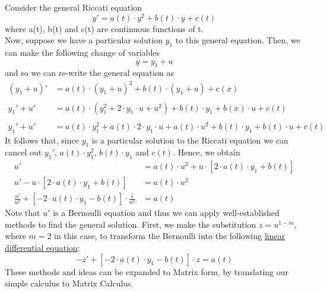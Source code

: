 Consider the general Riccati equation
\begin{equation}
    y' = a(t)\cdot y^2 + b(t)\cdot y + c(t)
\end{equation}
where a(t), b(t) and c(t) are continuous functions of t.
\\
Now, suppose we have a particular solution $y_1$ to this general equation. Then, we can make the following change of variables
\begin{equation}
    y = y_1 + u
\end{equation}
and so we can re-write the general equation as
\begin{equation}
    \begin{split}
        (y_1 + u)' & = a(t)\cdot (y_1 + u)^2 + b(t)\cdot (y_1 + u) + c(x)\\\\
        y_1' + u' & = a(t)\cdot (y_1^2 + 2\cdot y_1 \cdot u + u^2) + b(t)\cdot y_1 + b(x)\cdot u + c(t)\\\\
        y_1' + u' & = a(t)\cdot y_1^2 + a(t) \cdot 2\cdot y_1 \cdot u + a(t)\cdot u^2 + b(t)\cdot y_1 + b(t)\cdot u + c(t)
    \end{split}
\end{equation}
It follows that, since $y_1$ is a particular solution to the Riccati equation we can cancel out $y_1'$, $a(t)\cdot y_1^2$, $b(t)\cdot y_1$ and $c(t)$. Hence, we obtain
\begin{equation}
    \begin{split}
        u' & = a(t)\cdot u^2 + u\cdot [2\cdot a(t)\cdot y_1 + b(t)]\\
        u' - u\cdot [2\cdot a(t)\cdot y_1 + b(t)] & = a(t)\cdot u^2\\
        \frac{u'}{u^2} + [-2\cdot a(t)\cdot y_1 - b(t)]\cdot \frac{1}{u^2} &= a(t)
    \end{split}
\end{equation}
Note that $u'$ is a Bernoulli equation and thus we can apply well-established methods to find the general solution. First, we make the substitution $z = u^{1 - m}$, where $m = 2$ in this case, to transform the Bernoulli into the following \underline{linear differential equation}:
\begin{equation}
    -z' + [-2\cdot a(t)\cdot y_1 - b(t)]\cdot z = a(t)
\end{equation}
These methods and ideas can be expanded to Matrix form, by translating our simple calculus to Matrix Calculus.

